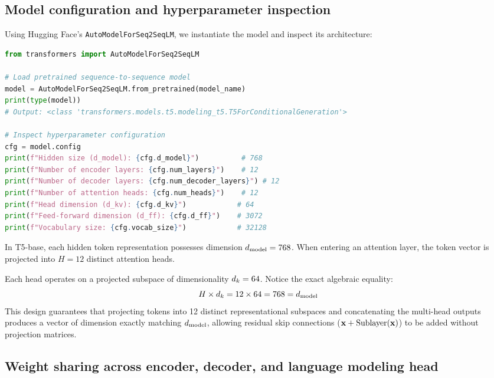 \documentclass[../labs.tex]{subfiles}
\begin{document}
\subsection{Model configuration and hyperparameter inspection}

Using Hugging Face's \texttt{AutoModelForSeq2SeqLM}, we instantiate the model and inspect its architecture:

\begin{lstlisting}[language=Python, caption={Loading T5-base model and inspecting architectural configuration (Cells 39--44).}, label={lst:lab02_model_config}]
from transformers import AutoModelForSeq2SeqLM

# Load pretrained sequence-to-sequence model
model = AutoModelForSeq2SeqLM.from_pretrained(model_name)
print(type(model))
# Output: <class 'transformers.models.t5.modeling_t5.T5ForConditionalGeneration'>

# Inspect hyperparameter configuration
cfg = model.config
print(f"Hidden size (d_model): {cfg.d_model}")          # 768
print(f"Number of encoder layers: {cfg.num_layers}")    # 12
print(f"Number of decoder layers: {cfg.num_decoder_layers}") # 12
print(f"Number of attention heads: {cfg.num_heads}")    # 12
print(f"Head dimension (d_kv): {cfg.d_kv}")            # 64
print(f"Feed-forward dimension (d_ff): {cfg.d_ff}")    # 3072
print(f"Vocabulary size: {cfg.vocab_size}")            # 32128
\end{lstlisting}

\begin{deepdive}
In T5-base, each hidden token representation possesses dimension $d_{\text{model}} = 768$. When entering an attention layer, the token vector is projected into $H = 12$ distinct attention heads. 

Each head operates on a projected subspace of dimensionality $d_k = 64$. Notice the exact algebraic equality:
\begin{equation}
    H \times d_k = 12 \times 64 = 768 = d_{\text{model}}
\end{equation}
This design guarantees that projecting tokens into 12 distinct representational subspaces and concatenating the multi-head outputs produces a vector of dimension exactly matching $d_{\text{model}}$, allowing residual skip connections ($\mathbf{x} + \text{Sublayer}(\mathbf{x})$) to be added without projection matrices.
\end{deepdive}

\subsection{Weight sharing across encoder, decoder, and language modeling head}
\end{document}
